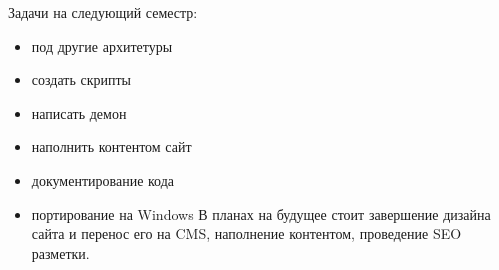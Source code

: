 Задачи на следующий семестр:
\begin{itemize}
  \item под другие архитетуры
  \item создать скрипты 
  \item написать демон
  \item наполнить контентом сайт
  \item документирование кода
  \item портирование на Windows
  В планах на будущее стоит завершение дизайна сайта и перенос его на CMS, наполнение контентом, проведение SEO разметки.
\end{itemize}
